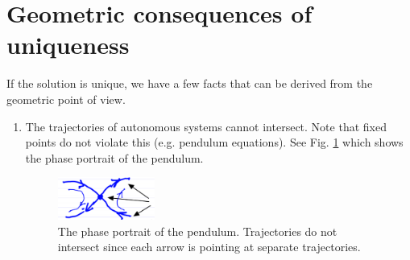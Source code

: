 \section{Geometric consequences of uniqueness}
If the solution is unique, we have a few facts that can be derived from the geometric point of view.
\begin{enumerate}
	\item The trajectories of autonomous systems cannot intersect. Note that fixed points do not violate this (e.g. pendulum equations). See Fig. \ref{fig:pend_phase_portrait} which shows the phase portrait of the pendulum.
		\begin{figure}[h!]
			\centering
			\includegraphics[width=0.3\textwidth]{figures/ch1/3pendulum_trajectories.png}
			\caption{The phase portrait of the pendulum. Trajectories do not intersect since each arrow is pointing at separate trajectories.}
			\label{fig:pend_phase_portrait}
		\end{figure}
		

\end{enumerate}
